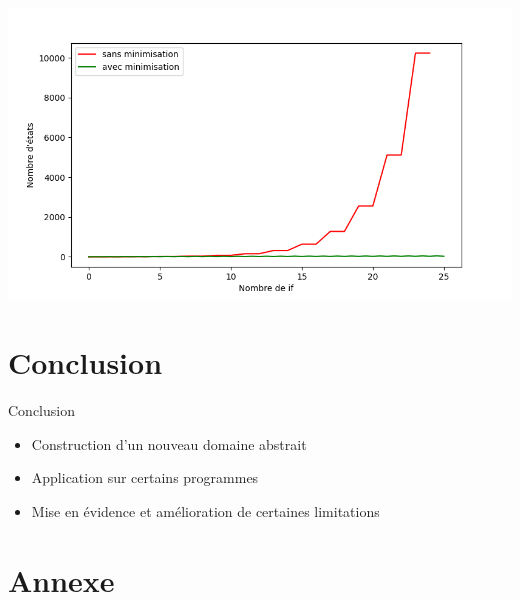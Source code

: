 \documentclass{beamer}
\begin{document}
\begin{frame}
  \includegraphics[scale=0.6]{ graphique_etats }
\end{frame}

\section{Conclusion}

\begin{frame}{Conclusion}
  \begin{itemize}
    \item Construction d'un nouveau domaine abstrait
    \item Application sur certains programmes
    \item Mise en évidence et amélioration de certaines limitations
  \end{itemize}
\end{frame}


\section{Annexe}
\end{document}
